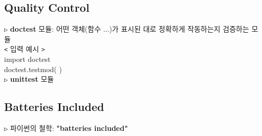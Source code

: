 \documentclass[11pt,a4paper]{article}
\begin{document}
\begin{spacing}{1.5}
\subsection{\Large\textbf{Quality Control}}
\texttt{▷} \textbf{doctest} 모듈: 어떤 객체(함수 ...)가 표시된 대로 정확하게 작동하는지 검증하는 모듈\\

\hspace*{2em}\texttt{<}  입력 예시  \texttt{>}\\
import doctest\\
doctest.testmod( )\\

\texttt{▷} \textbf{unittest} 모듈\\

\subsection{\Large\textbf{Batteries Included}}
\texttt{▷} 파이썬의 철학: \textbf{"batteries included"}

\end{spacing}
\end{document}
